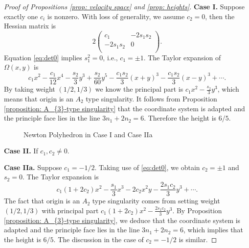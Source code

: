 \documentclass[12pt]{amsart}
\newcommand{\R}{\mathbb{R}}
\begin{document}
\begin{proof}[Proof of Propositions \ref{prop: velocity space} and \ref{prop: heights}]
		{\bf Case I.} Suppose exactly one $c_{i}$ is nonzero. With loss of generality, we assume $c_{2}=0$, then the Hessian matrix is
		\begin{equation*}
			2 
			\begin{pmatrix}
				c_{1} & -2s_{1}s_{2}\\
				-2s_{1}s_{2}&0\\
			\end{pmatrix}.
		\end{equation*}
Equation \eqref{eq:det0} implies $s_1^2=0$, i.e.,
$c_{1}=\pm1$. The Taylor expansion of $\Omega\left(x,y\right)$ is	\begin{equation*}
			c_{1}x^{2}-\frac{c_{1}}{12}x^{4}-\frac{s_{2}}{3}y^{3}+\frac{s_{2}}{60}y^{5}-\frac{c_{1}s_{2}}{3}\left(x+y\right)^{3}-\frac{c_{1}s_{2}}{3}\left(x-y\right)^{3}+\cdots.
	\end{equation*}
		By taking weight $\left(1/2,1/3\right)$ we know the principal part is $c_{1}x^{2}-\frac{s_{2}}{3}y^{3}$, which means that origin is an $A_{2}$ type singularity. It follows from Proposition \ref{proposition: A_{3}-type singularity} that the coordinate system is adapted and the principle face lies in the line $3n_1+2n_2=6$. Therefore the height is $6/5$. %
		\begin{figure}[H]
			\centering
			\caption{Newton Polyhedron in Case I and Case IIa}\label{figure: NP1}
		\end{figure}
  
		
		
		
		
		{\bf Case II.} If $c_{1},c_{2}\neq 0$. 
	
		{\bf Case IIa.} Suppose $c_{1}=-1/2$. Taking use of \eqref{eq:det0}, we obtain $c_{2}= \pm 1$ and $s_{2}= 0$. The Taylor expansion is 
		$$c_1(1+2c_2)x^2-\frac{s_1}{3}x^3-2c_2x^2y-\frac{2s_1c_2}{3}y^3+\cdots.$$
		The fact that origin is an $A_{2}$ type singularity comes from setting weight $\left(1/2,1/3\right)$ with principal part $c_1(1+2c_2)x^{2}-\frac{2s_1c_2}{3}y^3$. By Proposition \ref{proposition: A_{3}-type singularity}, we deduce that the coordinate system is adapted and the principle face lies in the line $3n_1+2n_2=6$, which implies that the height is $6/5$. The discussion in the case of $c_{2}=-1/2$ is similar. 
		

\end{proof}
\end{document}
